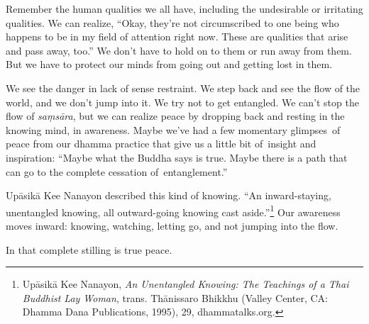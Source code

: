 Remember the human qualities we all have, including the undesirable or irritating qualities. We can realize, ``Okay, they're not circumscribed to one being who happens to be in my field of attention right now. These are qualities that arise and pass away, too.'' We don't have to hold on to them or run away from them. But we have to protect our minds from going out and getting lost in them.

We see the danger in lack of sense restraint. We step back and see the flow of the world, and we don't jump into it. We try not to get entangled. We can't stop the flow of \emph{saṃsāra}, but we can realize peace by dropping back and resting in the knowing mind, in awareness. Maybe we've had a few momentary \mbox{glimpses of} peace from our dhamma practice that give us a little bit \mbox{of insight} and inspiration: ``Maybe what the Buddha says is true. Maybe there is a path that can go to the complete cessation \mbox{of entanglement.''}

Upāsikā Kee Nanayon described this kind of knowing. ``An inward-staying, unentangled knowing, all outward-going knowing cast aside.''\footnote{Upāsikā Kee Nanayon, \emph{An Unentangled Knowing: The Teachings of a Thai Buddhist Lay Woman}, trans. Thānissaro Bhikkhu (Valley Center, CA: Dhamma Dana Publications, 1995), 29, dhammatalks.org.} Our awareness moves inward: knowing, watching, letting go, and not jumping into the flow.

In that complete stilling is true peace.
